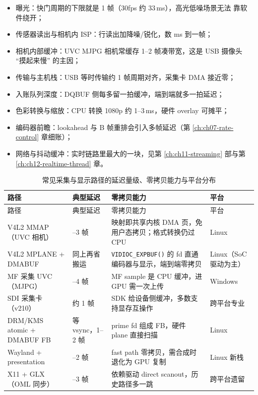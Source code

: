 \documentclass[12pt,a4paper,fontset=fandol]{ctexbook}
\newcommand{\Fn}[1]{\texttt{#1()}}
\begin{document}
\begin{itemize}
\item 曝光：快门周期的下限就是 1 帧（30fps 约 33\,ms），高光低噪场景无法
      靠软件绕开；
\item 传感器读出与相机内 ISP：行读出加降噪/锐化，数 ms 到一帧；
\item 相机内部缓冲：UVC MJPG 相机常缓存 1--2 帧凑带宽，这是 USB 摄像头
      ``摸起来慢'' 的主因；
\item 传输与主机栈：USB 等时传输约 1 帧周期对齐，采集卡 DMA 接近零；
\item 入账队列深度：DQBUF 侧每多留一拍缓冲，端到端就多一拍延迟；
\item 色彩转换与缩放：CPU 转换 1080p 约 1--3\,ms，硬件 overlay 可摊平；
\item 编码器前瞻：lookahead 与 B 帧重排会引入多帧延迟（第
      \ref{ch:ch07-rate-control} 章细账）；
\item 网络与抖动缓冲：实时链路里最大的一块，见第
      \ref{ch:ch11-streaming} 部与第 \ref{ch:ch12-realtime-thread} 章。
\end{itemize}

\begin{longtable}{>{\raggedright\arraybackslash}p{} >{\raggedright\arraybackslash}p{} >{\raggedright\arraybackslash}p{} >{\raggedright\arraybackslash}p{}}
\caption{常见采集与显示路径的延迟量级、零拷贝能力与平台分布}\label{tab:ch04-paths} \\
\toprule
路径 & 典型延迟 & 零拷贝能力 & 平台 \\
\midrule
\endfirsthead
\toprule
路径 & 典型延迟 & 零拷贝能力 & 平台 \\
\midrule
\endhead
\bottomrule
\endfoot
V4L2 MMAP（UVC 相机） & 1--3 帧 & 映射即共享内核 DMA 页，免用户态拷贝；格式转换仍过 CPU & Linux \\
V4L2 MPLANE + DMABUF & 同上再省搬运 & \Fn{VIDIOC\_EXPBUF} 的 fd 直通编码器与显示，端到端零拷贝 & Linux（SoC 驱动为主） \\
MF 采集 UVC（MJPG） & 2--4 帧 & MF sample 是 CPU 缓冲，进 GPU 需一次上传 & Windows \\
SDI 采集卡（v210） & 约 1 帧 & SDK 给设备侧缓冲，多数支持显存互操作 & 跨平台专业 \\
DRM/KMS atomic + DMABUF FB & 等 vsync，1--2 帧 & prime fd 组成 FB，硬件 plane 直接扫描 & Linux \\
Wayland + presentation & 1--2 帧 & fast path 零拷贝，需合成时退化为 GPU 复制 & Linux 新栈 \\
X11 + GLX（OML 同步） & 2--3 帧 & 依赖驱动 direct scanout，历史路径多一跳 & 跨平台遗留 \\
\end{longtable}
\end{document}
